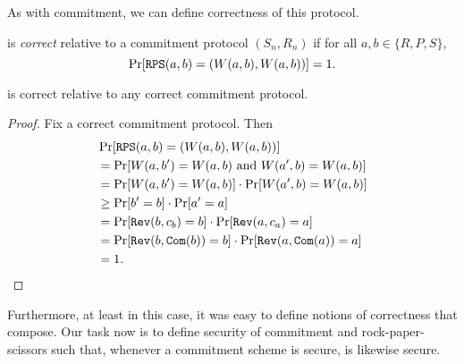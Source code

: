 \noindent
As with commitment, we can define correctness of this protocol.
\begin{dfn}
	 is \emph{correct} relative to a commitment
	protocol $(S_n,R_n)$ if for all $a,b\in\{R,P,S\}$,
	\[
		\Pr[{\texttt{RPS}}(a, b) = (W(a,b), W(a,b))] = 1.
	\]
\end{dfn}

\begin{prop}
	 is correct relative to any correct commitment
	protocol.
\end{prop}

\begin{proof}
	Fix a correct commitment protocol. Then \begin{align*}
		 & \Pr[{\texttt{RPS}}(a,b) = (W(a,b),W(a,b))]                                     \\
		 & = \Pr[W(a,b') = W(a,b)\text{ and }W(a',b) = W(a,b)]                       \\
		 & = \Pr[W(a,b') = W(a,b)]\cdot\Pr[W(a',b) = W(a,b)]                         \\
		 & \geq \Pr[b'=b]\cdot\Pr[a'=a]                                              \\
		 & = \Pr[{\texttt{Rev}}(b,c_b)=b]\cdot\Pr[{\texttt{Rev}}(a, c_a) = a]                  \\
		 & = \Pr[{\texttt{Rev}}(b,{\texttt{Com}}(b))=b]\cdot\Pr[{\texttt{Rev}}(a,{\texttt{Com}}(a)) = a] \\
		 & = 1.\qedhere
	\end{align*}
\end{proof}

\noindent
Furthermore, at least in this case, it was easy to define notions of correctness
that compose. Our task now is to define security of commitment and
rock-paper-scissors such that, whenever a commitment scheme is secure,
 is likewise secure.




